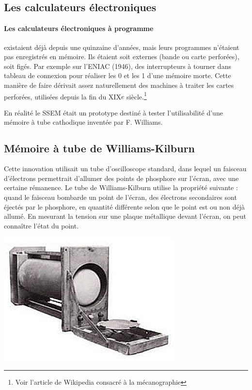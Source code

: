 \begin{multicols}{2}
\subsection{Les calculateurs électroniques}
\paragraph{Les calculateurs
électroniques à programme} existaient déjà depuis une quinzaine d'années, 
 mais leurs  programmes n'étaient pas
enregistrés en mémoire. Ils étaient soit externes (bande ou carte perforées),
soit figés. Par exemple sur l'ENIAC (1946), des interrupteurs à tourner dans tableau de
connexion pour réaliser les 0 et les 1 d'une mémoire morte. Cette
manière de faire dérivait assez naturellement des machines à traiter
les cartes perforées, utilisées depuis la fin du XIX${e}$ siècle.\footnote{Voir l'article
de Wikipedia consacré à la mécanographie}

En réalité le SSEM était un prototype destiné à tester l'utilisabilité
d'une mémoire à tube cathodique inventée par F. Williams. 

\subsection{Mémoire à tube de Williams-Kilburn
}
Cette innovation utilisait un tube d'oscilloscope standard, dans lequel un faisceau
d'électrons permettrait d'allumer des points de phosphore sur l'écran,
avec une certaine rémanence.  Le tube de Williams-Kilburn utilise la propriété
suivante : quand le faisceau bombarde un point de l'écran, des
électrons secondaires sont éjectés par le phosphore, en quantité
différente selon que le point est ou non déjà allumé. En mesurant 
la tension sur une 
plaque métallique devant l'écran, on peut
connaître l'état du point.

\includegraphics[width=0.9\linewidth]{Historique/william-kilburn_tube.jpg}


\end{multicols}
